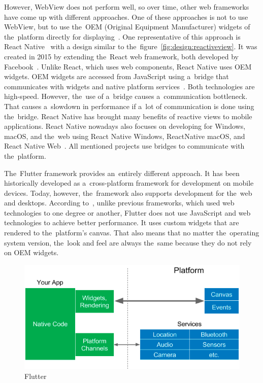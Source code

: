 However, WebView does not perform well, so over time, other web frameworks have come up with different approaches.
One of these approaches is not to use WebView, but to use the~OEM (Original Equipment Manufacturer) widgets of the~platform directly for displaying~\cite{leler_2017_whats}.
One representative of this approach is React Native~\cite{a2022_react} with a design similar to the~figure~\ref{fig:design:reactiveview}.
It was created in 2015 by extending the~React web framework, both developed by Facebook~\cite{a2022_react}.
Unlike React, which uses web components, React Native uses OEM widgets.
OEM widgets are accessed from JavaScript using a~bridge that communicates with widgets and native platform services~\cite{leler_2017_whats}.
Both technologies are high-speed.
However, the~use of a~bridge causes a~communication bottleneck.
That causes a~slowdown in performance if a~lot of communication is done using the~bridge.
React Native has brought many benefits of reactive views to mobile applications.
React Native nowadays also focuses on developing for Windows, macOS, and the~web using React Native Windows, ReactNative macOS, and React Native Web~\cite{a2022_react}.
All mentioned projects use bridges to communicate with the~platform.

The~Flutter framework provides an~entirely different approach.
It has been historically developed as a~cross-platform framework for development on mobile devices.
Today, however, the~framework also supports development for the~web and desktops.
According to~\cite{leler_2017_whats}, unlike previous frameworks, which used web technologies to one degree or another, Flutter does not use JavaScript and web technologies to achieve better performance.
It uses custom widgets that are rendered to the~platform's canvas.
That also means that no matter the~operating system version, the~look and feel are always the~same because they do not rely on OEM widgets. 

\begin{figure}
    \centering
    \includegraphics[width=1\linewidth]{assets/design/flutter.png}
    \caption{Flutter~\cite{leler_2017_whats}}
    \label{fig:design:flutterview}
\end{figure}


